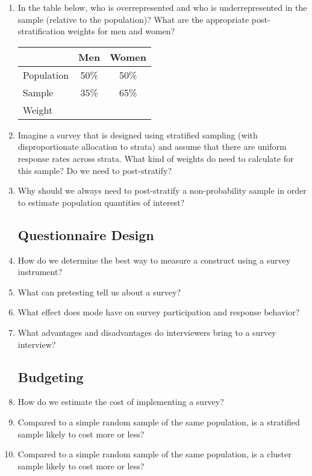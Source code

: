 \documentclass[12pt, a4]{article}
\begin{document}
\begin{enumerate}
\item In the table below, who is overrepresented and who is underrepresented in the sample (relative to the population)? What are the appropriate post-stratification weights for men and women?

\begin{center}
\begin{tabular}{lcc}\hline
&Men&Women\\ \hline
Population&50\%&50\%\\
Sample&35\%&65\%\\ \hline
Weight&&\\ \hline
\end{tabular}
\end{center}

\item Imagine a survey that is designed using stratified sampling (with disproportionate allocation to strata) and assume that there are uniform response rates across strata. What kind of weights do need to calculate for this sample? Do we need to post-stratify?
\item Why should we always need to post-stratify a non-probability sample in order to estimate population quantities of interest?


\subsection*{Questionnaire Design}

\item How do we determine the best way to measure a construct using a survey instrument?
\item What can pretesting tell us about a survey?
\item What effect does mode have on survey participation and response behavior?
\item What advantages and disadvantages do interviewers bring to a survey interview?

\subsection*{Budgeting}

\item How do we estimate the cost of implementing a survey?
\item Compared to a simple random sample of the same population, is a stratified sample likely to cost more or less?
\item Compared to a simple random sample of the same population, is a cluster sample likely to cost more or less?


\end{enumerate}
\end{document}
